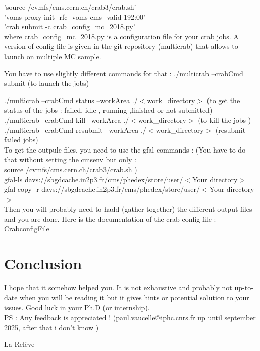 \documentclass[reprint, a4paper, nofootinbib, amsmath, amssymb, aps]{revtex4-1}
\begin{document}
'source /cvmfs/cms.cern.ch/crab3/crab.sh' \\
'voms-proxy-init -rfc -voms cms -valid 192:00'\\
'crab submit -c crab\_config\_mc\_2018.py' \\

where crab\_config\_mc\_2018.py is a configuration file for your crab jobs. A version of config file is given in the git repository (multicrab) that allows to launch on multiple  MC sample.

You have to use slightly different commands for that :
./multicrab --crabCmd submit (to launch the jobs)

./multicrab --crabCmd status --workArea ./$<$work\_directory$>$ (to get the status of the jobs : failed, idle , running ,finished or not submitted)\\
./multicrab --crabCmd kill --workArea ./$<$work\_directory$>$ (to kill the jobs )\\
./multicrab --crabCmd resubmit --workArea ./$<$work\_directory$>$ (resubmit failed jobs)\\

To get the outpule files, you need to use the gfal commands :
(You have to do that without setting the cmsenv but only :\\
source /cvmfs/cms.cern.ch/crab3/crab.sh )\\
gfal-ls davs://sbgdcache.in2p3.fr/cms/phedex/store/user/$<$Your directory$>$\\
gfal-copy -r davs://sbgdcache.in2p3.fr/cms/phedex/store/user/$<$Your directory$>$ \\
Then you will probably need to hadd (gather together) the different output files and you are done.
Here is the documentation of the crab config file : \\
\href{https://twiki.cern.ch/twiki/bin/view/CMSPublic/CRAB3ConfigurationFile}{CrabconfigFile}

\section{Conclusion}

I hope that it somehow helped you. It is not exhaustive and probably not up-to-date when you will be reading it but it gives hints or potential solution to your issues. Good luck in your Ph.D (or internship).\\
PS : Any feedback is appreciated ! (paul.vaucelle@iphc.cnrs.fr up until september 2025, after that i don't know )

La Relève 
\end{document}
